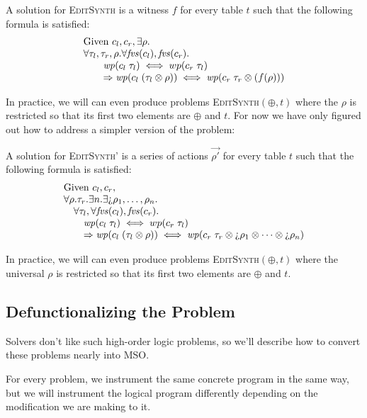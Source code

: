 A solution for \textsc{EditSynth} is a witness $f$ for every table $t$ such that
the following formula is satisfied:
\[\begin{array}{l}
    \text{Given } c_l,c_r, \exists \rho. \\
    \forall \tau_l,\tau_r,\rho. \forall \mathit{fvs}(c_l), \mathit{fvs}(c_r). \\
    \qquad \mathit{wp}(c_l\; \tau_l) \iff wp(c_r\; \tau_l) \\
    \qquad \Rightarrow \mathit{wp}(c_l\; (\tau_l \otimes \rho)) \iff \mathit{wp}(c_r\; \tau_r \otimes (f(\rho)))
  \end{array}\]

In practice, we will can even produce problems \textsc{EditSynth}$(\oplus,t)$
where the $\rho$ is restricted so that its first two elements are $\oplus$ and
$t$. For now we have only figured out how to address a simpler version of the
problem:

A solution for \textsc{EditSynth'} is a series of actions $\vec{\rho'}$ for every table $t$ such that
the following formula is satisfied:
\[\begin{array}{l}
    \text{Given } c_l,c_r, \\
    \forall \rho. \tau_r.\exists n.\exists \hole\rho_1,\ldots,\rho_n. \\ 
    \quad \forall \tau_l, \forall \fvs(c_l), \fvs(c_r). \\
    \qquad \wp(c_l\; \tau_l) \iff wp(c_r\; \tau_l) \\
    \qquad \Rightarrow \wp(c_l\; (\tau_l \otimes \rho)) \iff \wp(c_r\; \tau_r
    \otimes \hole\rho_1 \otimes \cdots \otimes \hole\rho_n )
  \end{array}\]

In practice, we will can even produce problems \textsc{EditSynth}$(\oplus,t)$
where the universal $\rho$ is restricted so that its first two elements are
$\oplus$ and $t$.



\subsection{Defunctionalizing the Problem}

Solvers don't like such high-order logic problems, so we'll describe how to
convert these problems nearly into MSO.

For every problem, we instrument the same concrete program in the same way, but
we will instrument the logical program differently depending on the modification
we are making to it.

